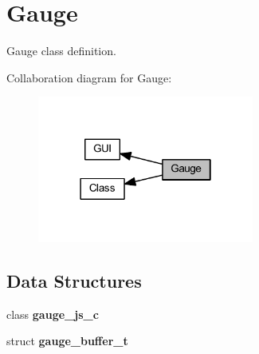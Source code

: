 \section{Gauge}
\label{group___gauge}


Gauge class definition.  


Collaboration diagram for Gauge\+:\nopagebreak
\begin{figure}[H]
\begin{center}
\leavevmode
\includegraphics[width=202pt]{group___gauge}
\end{center}
\end{figure}
\subsection*{Data Structures}
\begin{DoxyCompactItemize}
\item 
class \textbf{ gauge\+\_\+js\+\_\+c}
\item 
struct \textbf{ gauge\+\_\+buffer\+\_\+t}
\end{DoxyCompactItemize}
